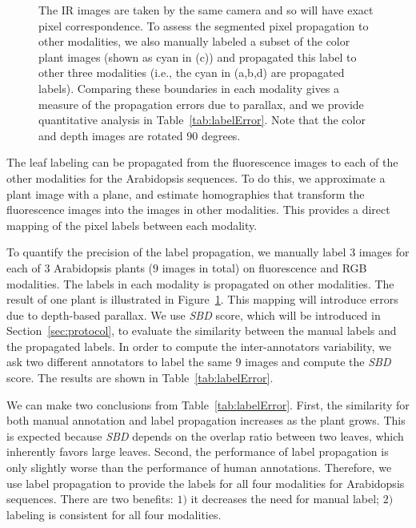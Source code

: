 \begin{figure}[t]
\begin{centering}
{The IR images are taken by the same camera and so will have exact pixel correspondence.
To assess the segmented pixel propagation to other modalities, we also manually labeled a subset of the color plant images (shown as cyan in (c)) and propagated this label to other three modalities (i.e., the cyan in (a,b,d) are propagated labels).
Comparing these boundaries in each modality gives a measure of the propagation errors due to parallax, and we provide quantitative analysis in Table~\ref{tab:labelError}.
Note that the color and depth images are rotated $90$ degrees.}
\label{fig:LabelAlignment}
\end{centering}
\end{figure}

The leaf labeling can be propagated from the fluorescence images to each of the other modalities for the Arabidopsis sequences.
To do this, we approximate a plant image with a plane, and estimate homographies that transform the fluorescence images into the images in other modalities.
This provides a direct mapping of the pixel labels between each modality.

To quantify the precision of the label propagation, we manually label $3$ images for each of $3$ Arabidopsis plants ($9$ images in total) on fluorescence and RGB modalities.
The labels in each modality is propagated on other modalities.
The result of one plant is illustrated in Figure~\ref{fig:LabelAlignment}.
This mapping will introduce errors due to depth-based parallax.
We use {\it{SBD}} score, which will be introduced in Section~\ref{sec:protocol}, to evaluate the similarity between the manual labels and the propagated labels.
In order to compute the inter-annotators variability, we ask two different annotators to label the same $9$ images and compute the {\it{SBD}} score.
The results are shown in Table~\ref{tab:labelError}.

We can make two conclusions from Table~\ref{tab:labelError}.
First, the similarity for both manual annotation and label propagation increases as the plant grows.
This is expected because {\it{SBD}} depends on the overlap ratio between two leaves, which inherently favors large leaves.
Second, the performance of label propagation is only slightly worse than the performance of human annotations.
Therefore, we use label propagation to provide the labels for all four modalities for Arabidopsis sequences.
There are two benefits: $1)$ it decreases the need for manual label; $2)$ labeling is consistent for all four modalities.

